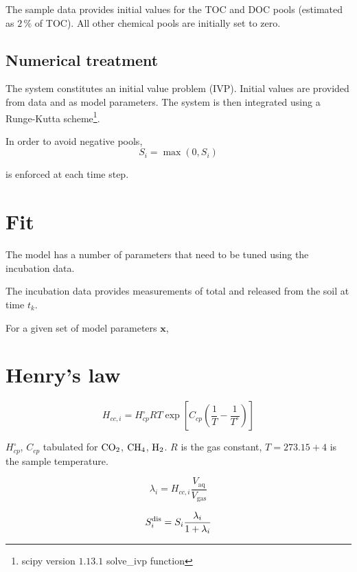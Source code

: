 \documentclass{article}
\begin{document}
The sample data provides initial values for the TOC and DOC pools (estimated as $2\,\%$ of TOC).
All other chemical pools are initially set to zero.






\subsection{Numerical treatment}

The system constitutes an initial value problem (IVP).
Initial values are provided from data and as model parameters.
The system is then integrated using a %
Runge-Kutta scheme\footnote{scipy version $1.13.1$ solve\_ivp function}.

In order to avoid negative pools, 
\begin{equation}
S_i = \max(0, S_i)
\end{equation}

is enforced at each time step.


\section{Fit}


The model has a number of parameters that need to be tuned using the incubation data.

The incubation data provides measurements of total \cotwo and \chfour released from the soil at time $t_k$.

For a given set of model parameters $\bm{x}$, 



\appendix

\section{Henry's law}
\begin{equation}
 H_{cc,i} = H_{cp}^{\circ} RT \exp\left[C_{cp} \left(\frac{1}{T} - \frac{1}{T^{\circ}}\right)\right]
\end{equation}

$H_{cp}^{\circ}$, $C_{cp}$ tabulated for $\ce{CO2}$, $\ce{CH4}$, $\ce{H2}$.
$R$ is the gas constant, $T = 273.15 + 4$ is the sample temperature.


\begin{equation}
\lambda_i = H_{cc,i} \frac{V_{\mathrm{aq}}}{V_{\mathrm{gas}}}
\end{equation}

\begin{equation}
S^{\mathrm{dis}}_i = S_i\frac{\lambda_i}{1+\lambda_i}
\end{equation}


\end{document}
